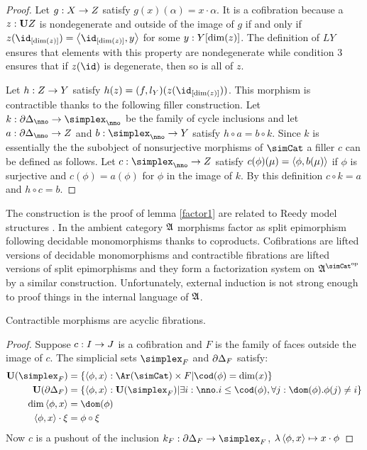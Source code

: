 \documentclass[csh.tex]{subfiles}
\begin{document}
\begin{proof}
Let $g: X\to Z$ satisfy $g(x)(\alpha) = x\cdot\alpha$. It is a cofibration because a $z:\mathbf{U} Z$ is nondegenerate and outside of the image of $g$ if and only if $z(\id_{[\dim(z)]}) = \tuplet{\id_{[\dim(z)]},y}$ for some $y: Y[\dim(z)]$. The definition of $LY$ ensures that elements with this property are nondegenerate while condition 3 ensures that if $z(\id)$ is degenerate, then so is all of $z$.

Let $h: Z\to Y$ satisfy $h(z) = (f,l_Y)(z(\id_{[\dim(z)]}))$. This morphism is contractible thanks to the following filler construction.
Let $k\of\cycle_\nno\to\simplex_\nno$ be the family of cycle inclusions and let $a\of \cycle_\nno\to Z$ and $b\of \simplex_\nno\to Y$ satisfy $h\circ a = b\circ k$. Since $k$ is essentially the the subobject of nonsurjective morphisms of $\simCat$ a filler $c$ can be defined as follows.
Let $c\of \simplex_\nno\to Z$ satisfy $c(\phi)(\mu) = \left\langle \phi,b(\mu) \right\rangle$ if $\phi$ is surjective and $c(\phi) = a(\phi)$ for $\phi$ in the image of $k$. By this definition $c\circ k = a$ and $h\circ c = b$.\end{proof}

\begin{remark} The construction is the proof of lemma \ref{factor1} are related to Reedy model structures \citep{Reedy74}. In the ambient category $\mathfrak A$ morphisms factor as split epimorphism following decidable monomorphisms thanks to coproducts. Cofibrations are lifted versions of decidable monomorphisms and contractible fibrations are lifted versions of split epimorphisms and they form a factorization system on $\ambient\s$ by a similar construction. Unfortunately, external induction is not strong enough to proof things in the internal language of $\mathfrak A$.
\end{remark}

\begin{lemma} Contractible morphisms are acyclic fibrations.\label{Reedy}\end{lemma}

\begin{proof}
Suppose $c: I\to J$ is a cofibration and $F$ is the family of faces outside the image of $c$. 
The simplicial sets $\simplex_F$ and $\partial\Delta_F$ satisfy:
\begin{align*}
\base(\simplex_F) &= \set{ \tuplet{\phi,x}\of\Ar(\simCat)\times F | \cod(\phi) = \dim(x) } \\
\base(\cycle_F) &= \set{\tuplet{\phi,x}\of\base(\simplex_F)\middle|\exists i\of\nno.i\leq \cod(\phi),\forall j\of \dom(\phi).\phi(j)\neq i} \\
\dim\tuplet{\phi,x} &= \dom(\phi) \\
\tuplet{\phi,x}\cdot \xi &=\phi\circ\xi
\end{align*}
Now $c$ is a pushout of the inclusion $k_F\of\cycle_F\to\simplex_F$, $\lambda \left\langle \phi,x \right\rangle \mapsto x\cdot \phi$ 


\end{proof}
\end{document}
